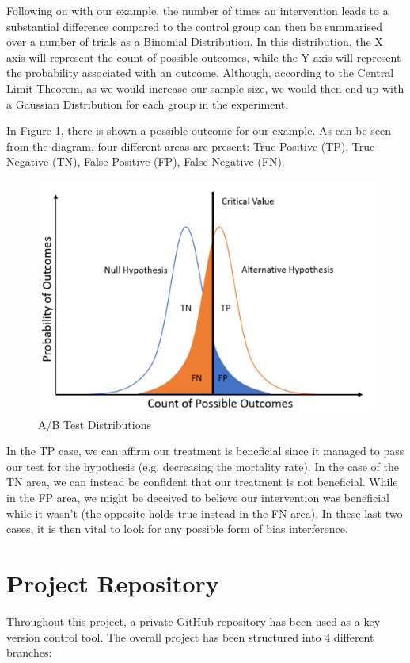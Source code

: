 \begin{appendices}
Following on with our example, the number of times an intervention leads to a substantial difference compared to the control group can then be summarised over a number of trials as a Binomial Distribution. In this distribution, the X axis will represent the count of possible outcomes, while the Y axis will represent the probability associated with an outcome. Although, according to the Central Limit Theorem, as we would increase our sample size, we would then end up with a Gaussian Distribution for each group in the experiment. 

In Figure \ref{test_dist}, there is shown a possible outcome for our example. As can be seen from the diagram, four different areas are present: True Positive (TP), True Negative (TN), False Positive (FP), False Negative (FN).
\vspace{-0.2cm}
\begin{figure}[ht!]%
    \centering
    \includegraphics[width=0.6\linewidth]{latex/images/abtest.pdf}
    \vspace{-0.2cm}
    \caption{A/B Test Distributions}
    \label{test_dist}
\end{figure}
\vspace{-0.6cm}

In the TP case, we can affirm our treatment is beneficial since it managed to pass our test for the hypothesis (e.g. decreasing the mortality rate). In the case of the TN area, we can instead be confident that our treatment is not beneficial. While in the FP area, we might be deceived to believe our intervention was beneficial while it wasn't (the opposite holds true instead in the FN area). In these last two cases, it is then vital to look for any possible form of bias interference.

\clearpage
\section{Project Repository}
\label{repo}
Throughout this project, a private GitHub repository has been used as a key version control tool. The overall project has been structured into 4 different branches:


\end{appendices}
